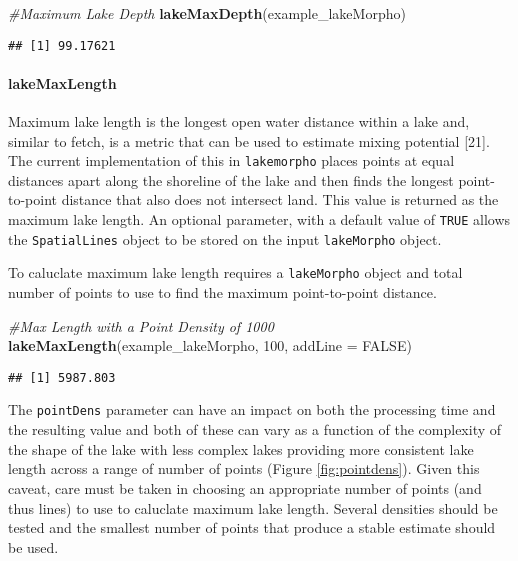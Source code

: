 \documentclass[11pt,]{article}
\newenvironment{Shaded}{\begin{snugshade}}{\end{snugshade}}
\newcommand{\KeywordTok}[1]{\textcolor[rgb]{0.13,0.29,0.53}{\textbf{{#1}}}}
\newcommand{\DataTypeTok}[1]{\textcolor[rgb]{0.13,0.29,0.53}{{#1}}}
\newcommand{\DecValTok}[1]{\textcolor[rgb]{0.00,0.00,0.81}{{#1}}}
\newcommand{\CommentTok}[1]{\textcolor[rgb]{0.56,0.35,0.01}{\textit{{#1}}}}
\newcommand{\OtherTok}[1]{\textcolor[rgb]{0.56,0.35,0.01}{{#1}}}
\newcommand{\NormalTok}[1]{{#1}}
\begin{document}
\begin{Shaded}
\begin{Highlighting}[]
\CommentTok{#Maximum Lake Depth}
\KeywordTok{lakeMaxDepth}\NormalTok{(example_lakeMorpho)}
\end{Highlighting}
\end{Shaded}

\begin{verbatim}
## [1] 99.17621
\end{verbatim}

\paragraph{lakeMaxLength}\label{lakemaxlength}

Maximum lake length is the longest open water distance within a lake
and, similar to fetch, is a metric that can be used to estimate mixing
potential {[}21{]}. The current implementation of this in
\texttt{lakemorpho} places points at equal distances apart along the
shoreline of the lake and then finds the longest point-to-point distance
that also does not intersect land. This value is returned as the maximum
lake length. An optional parameter, with a default value of
\texttt{TRUE} allows the \texttt{SpatialLines} object to be stored on
the input \texttt{lakeMorpho} object.

To caluclate maximum lake length requires a \texttt{lakeMorpho} object
and total number of points to use to find the maximum point-to-point
distance.

\begin{Shaded}
\begin{Highlighting}[]
\CommentTok{#Max Length with a Point Density of 1000}
\KeywordTok{lakeMaxLength}\NormalTok{(example_lakeMorpho, }\DecValTok{100}\NormalTok{, }\DataTypeTok{addLine =} \OtherTok{FALSE}\NormalTok{)}
\end{Highlighting}
\end{Shaded}

\begin{verbatim}
## [1] 5987.803
\end{verbatim}

The \texttt{pointDens} parameter can have an impact on both the
processing time and the resulting value and both of these can vary as a
function of the complexity of the shape of the lake with less complex
lakes providing more consistent lake length across a range of number of
points (Figure \ref{fig:pointdens}). Given this caveat, care must be
taken in choosing an appropriate number of points (and thus lines) to
use to caluclate maximum lake length. Several densities should be tested
and the smallest number of points that produce a stable estimate should
be used.
\end{document}
